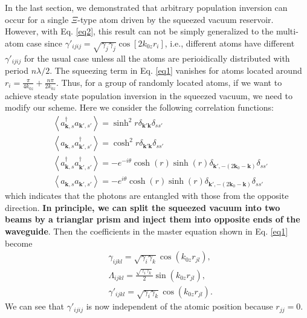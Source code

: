 \documentclass[aps,showpacs,twocolumn,twoside,groupedaddress]{revtex4}
\let\vec\bm
\begin{document}
In the last section, we demonstrated that arbitrary population inversion can occur for a single $\Xi$-type atom driven by the squeezed vacuum reservoir. However, with Eq.  \eqref{eq2}, this result can not be simply generalized to the multi-atom case since $\gamma'_{ijij}=\sqrt{\gamma_{j}\gamma_{j}}\cos[2k_{0z}r_{i}]$, i.e., different atoms have different $\gamma'_{ijij}$ for the usual case unless all the atoms are perioidically distributed with period $n\lambda/2$. The squeezing term in Eq. \eqref{eq1} vanishes for atoms located around $r_i=\frac{\pi}{4k_{0z}}+\frac{n\pi}{2k_{0z}}$. Thus, for a group of randomly located atoms, if we want to achieve steady state population inversion in the squeezed vacuum, we need to modify our scheme. Here we consider the following correlation functions:
\begin{equation}
\label{eq0b}
\begin{split}
& \left\langle a_{\vec{k},s}^{\dagger}a_{\vec{k}',s'}\right\rangle =\sinh^{2}r\delta_{\vec{k}'\vec{k}}\delta_{ss'} \\
& \left\langle a_{\vec{k},s}a_{\vec{k}',s'}^{\dagger}\right\rangle =\cosh^{2}r\delta_{\vec{k}'\vec{k}}\delta_{ss'}\\
& \left\langle a_{\vec{k},s}^{\dagger}a_{\vec{k}',s'}^{\dagger}\right\rangle =-e^{-i\theta}\cosh(r)\sinh(r)\delta_{\vec{k}',-(2\vec{k}_{0}-\vec{k})}\delta_{ss'}\\
&\left\langle a_{\vec{k},s}a_{\vec{k}',s'}\right\rangle =-e^{i\theta}\cosh(r)\sinh(r)\delta_{\vec{k}',-(2\vec{k}_{0}-\vec{k})}\delta_{ss'}
\end{split}
\end{equation}
which indicates that the photons are entangled with those from the opposite direction. \textbf{In principle, we can split the squeezed vacuum into two beams by a trianglar prism and inject them into opposite ends of the waveguide}. Then the coefficients in the master equation shown in Eq.  \eqref{eq1} become
\begin{equation}
\label{eq2b}
\begin{split}
& \gamma_{ijkl}=\sqrt{\gamma_{i}\gamma_{k}}\cos(k_{0z}r_{jl}), \\
& \Lambda_{ijkl}=\frac{\sqrt{\gamma_{i}\gamma_{k}}}{2}\sin(k_{0z}r_{jl}),\\
& \gamma'_{ijkl}=\sqrt{\gamma_{i}\gamma_{k}}\cos(k_{0z}r_{jl}).
\end{split}
\end{equation}
We can see that $\gamma'_{ijij}$ is now independent of the atomic position because $r_{jj}=0$.
\end{document}
